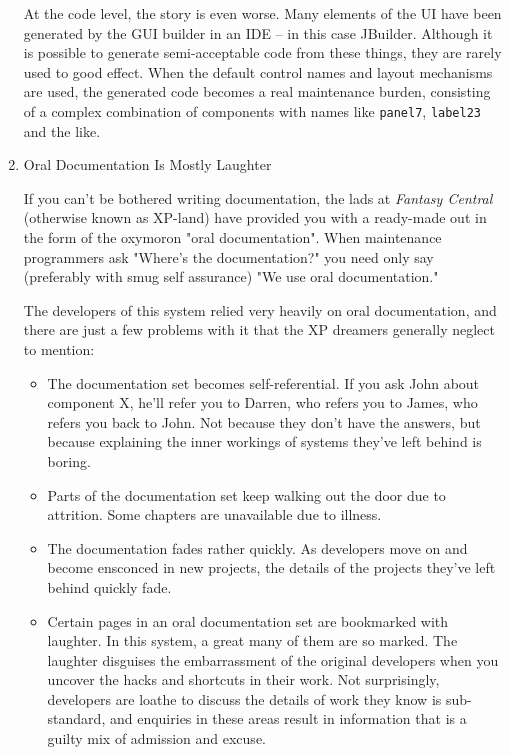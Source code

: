 \documentclass{article}
\begin{document}
\begin{enumerate}
At the code level, the story is even worse. Many elements of the UI have
been generated by the GUI builder in an IDE -- in this case JBuilder.
Although it is possible to generate semi-acceptable code from these
things, they are rarely used to good effect. When the default control
names and layout mechanisms are used, the generated code becomes a real
maintenance burden, consisting of a complex combination of components
with names like \texttt{panel7}, \texttt{label23} and the like.

\item Oral Documentation Is Mostly Laughter
\label{sec:orgheadline341}

If you can't be bothered writing documentation, the lads at \emph{Fantasy
Central} (otherwise known as XP-land) have provided you with a
ready-made out in the form of the oxymoron "oral documentation". When
maintenance programmers ask "Where's the documentation?" you need only
say (preferably with smug self assurance) "We use oral documentation."

The developers of this system relied very heavily on oral documentation,
and there are just a few problems with it that the XP dreamers generally
neglect to mention:

\begin{itemize}
\item The documentation set becomes self-referential. If you ask John about
component X, he'll refer you to Darren, who refers you to James, who
refers you back to John. Not because they don't have the answers, but
because explaining the inner workings of systems they've left behind
is boring.
\item Parts of the documentation set keep walking out the door due to
attrition. Some chapters are unavailable due to illness.
\item The documentation fades rather quickly. As developers move on and
become ensconced in new projects, the details of the projects they've
left behind quickly fade.
\item Certain pages in an oral documentation set are bookmarked with
laughter. In this system, a great many of them are so marked. The
laughter disguises the embarrassment of the original developers when
you uncover the hacks and shortcuts in their work. Not surprisingly,
developers are loathe to discuss the details of work they know is
sub-standard, and enquiries in these areas result in information that
is a guilty mix of admission and excuse.
\end{itemize}


\end{enumerate}
\end{document}
